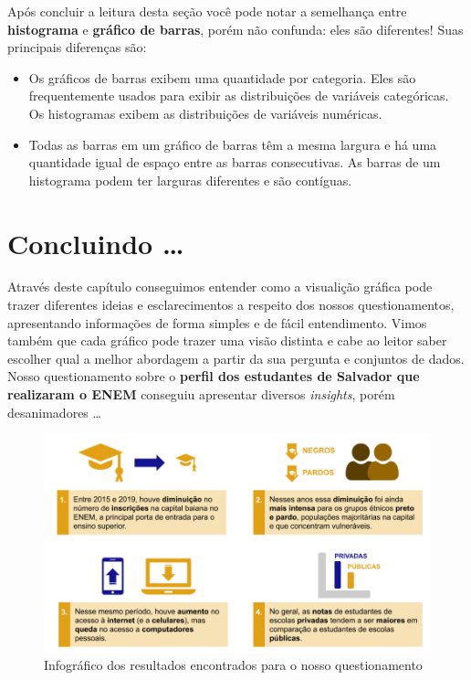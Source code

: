 \documentclass[
  portuguese,
  oneside]{book}
\begin{document}
Após concluir a leitura desta seção você pode notar a semelhança entre \textbf{histograma} e \textbf{gráfico de barras}, porém não confunda: eles são diferentes! Suas principais diferenças são:

\begin{itemize}
\item
  Os gráficos de barras exibem uma quantidade por categoria. Eles são frequentemente usados para exibir as distribuições de variáveis categóricas. Os histogramas exibem as distribuições de variáveis numéricas.
\item
  Todas as barras em um gráfico de barras têm a mesma largura e há uma quantidade igual de espaço entre as barras consecutivas. As barras de um histograma podem ter larguras diferentes e são contíguas.
\end{itemize}

\hypertarget{conc}{%
\section{Concluindo \ldots{}}\label{conc}}

Através deste capítulo conseguimos entender como a visualição gráfica pode trazer diferentes ideias e esclarecimentos a respeito dos nossos questionamentos, apresentando informações de forma simples e de fácil entendimento. Vimos também que cada gráfico pode trazer uma visão distinta e cabe ao leitor saber escolher qual a melhor abordagem a partir da sua pergunta e conjuntos de dados.
Nosso questionamento sobre o \textbf{perfil dos estudantes de Salvador que realizaram o ENEM} conseguiu apresentar diversos \emph{insights}, porém desanimadores \ldots{}

\begin{figure}

{\centering \includegraphics[width=0.99\linewidth]{fig_cap3/infografico_cap3} 

}

\caption{Infográfico dos resultados encontrados para o nosso questionamento}\label{fig:f319}
\end{figure}
\end{document}
